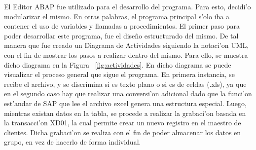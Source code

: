 \indent El Editor ABAP fue utilizado para el desarrollo del programa. Para esto, decidi'o modularizar el mismo. En otras palabras, el programa principal s'olo iba a contener el uso de variables y llamadas a procedimientos. 
\newline
\newline
\indent El primer paso para poder desarrollar este programa, fue el dise\~no estructurado del mismo. De tal manera que fue creado un Diagrama de Actividades siguiendo la notaci'on UML, con el fin de mostrar los pasos a realizar dentro del mismo. Para ello, se muestra dicho diagrama en la Figura ~\ref{fig:actividades}. 
\newline
\newline
\indent En dicho diagrama se puede visualizar el proceso general que sigue el programa. En primera instancia, se recibe el archivo, y se discrimina si es texto plano o si es de celdas (.xls), ya que en el segundo caso hay que realizar una conversi'on adicional dado que la funci'on est'andar de SAP que lee el archivo excel genera una estructura especial. Luego, mientras existan datos en la tabla, se procede a realizar la grabaci'on basada en la transacci'on XD01, la cual permite crear un nuevo registro en el maestro de clientes. Dicha grabaci'on se realiza con el fin de poder almacenar los datos en grupo, en vez de hacerlo de forma individual. 
